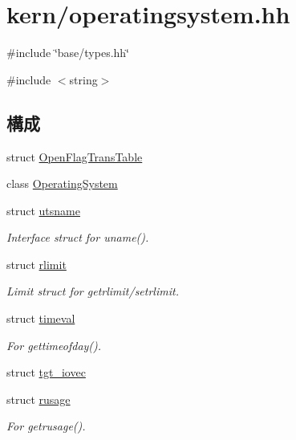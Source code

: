 \hypertarget{operatingsystem_8hh}{
\section{kern/operatingsystem.hh}
\label{operatingsystem_8hh}
}
{\ttfamily \#include \char`\"{}base/types.hh\char`\"{}}\par
{\ttfamily \#include $<$string$>$}\par
\subsection*{構成}
\begin{DoxyCompactItemize}
\item 
struct \hyperlink{structOpenFlagTransTable}{OpenFlagTransTable}
\item 
class \hyperlink{classOperatingSystem}{OperatingSystem}
\item 
struct \hyperlink{structOperatingSystem_1_1utsname}{utsname}
\begin{DoxyCompactList}\small\item\em Interface struct for uname(). \item\end{DoxyCompactList}\item 
struct \hyperlink{structOperatingSystem_1_1rlimit}{rlimit}
\begin{DoxyCompactList}\small\item\em Limit struct for getrlimit/setrlimit. \item\end{DoxyCompactList}\item 
struct \hyperlink{structOperatingSystem_1_1timeval}{timeval}
\begin{DoxyCompactList}\small\item\em For gettimeofday(). \item\end{DoxyCompactList}\item 
struct \hyperlink{structOperatingSystem_1_1tgt__iovec}{tgt\_\-iovec}
\item 
struct \hyperlink{structOperatingSystem_1_1rusage}{rusage}
\begin{DoxyCompactList}\small\item\em For getrusage(). \item\end{DoxyCompactList}\end{DoxyCompactItemize}
